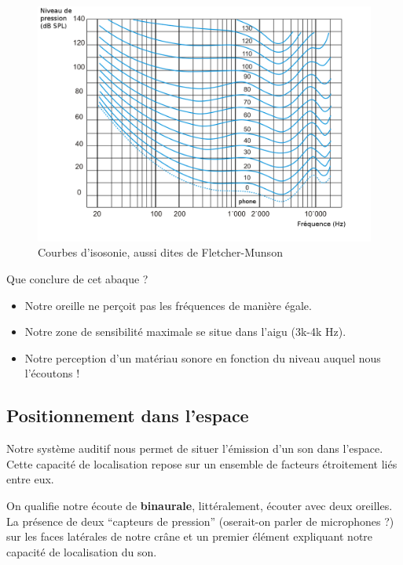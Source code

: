 \documentclass[
]{book}
\providecommand{\tightlist}{%
  \setlength{\itemsep}{0pt}\setlength{\parskip}{0pt}}
\begin{document}
\begin{figure}

{\centering \includegraphics[width=1\linewidth]{_resources/diagrams/Courbes_isosonie} 

}

\caption{Courbes d'isosonie, aussi dites de Fletcher-Munson}\label{fig:unnamed-chunk-7}
\end{figure}

Que conclure de cet abaque ?

\begin{itemize}
\tightlist
\item
  Notre oreille ne perçoit pas les fréquences de manière égale.
\item
  Notre zone de sensibilité maximale se situe dans l'aigu (3k-4k Hz).
\item
  Notre perception d'un matériau sonore en fonction du niveau auquel nous l'écoutons !
\end{itemize}

\hypertarget{positionnement-dans-lespace}{%
\subsection{Positionnement dans l'espace}\label{positionnement-dans-lespace}}

Notre système auditif nous permet de situer l'émission d'un son dans l'espace. Cette capacité de localisation repose sur un ensemble de facteurs étroitement liés entre eux.

On qualifie notre écoute de \textbf{binaurale}, littéralement, écouter avec deux oreilles. La présence de deux ``capteurs de pression'' (oserait-on parler de microphones ?) sur les faces latérales de notre crâne et un premier élément expliquant notre capacité de localisation du son.
\end{document}
